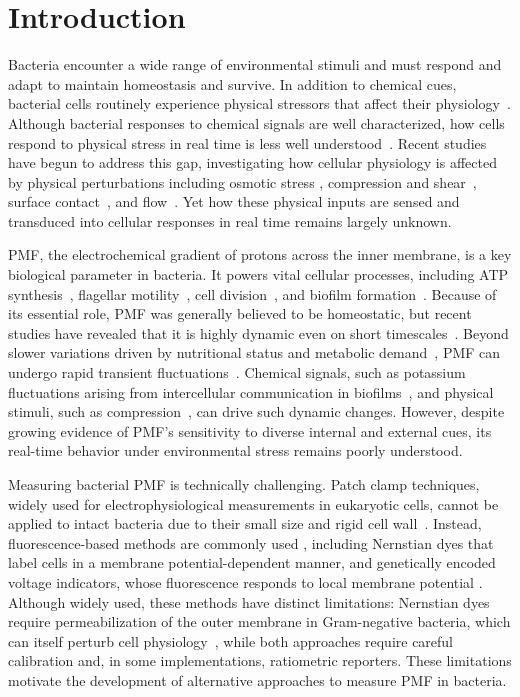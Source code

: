 \documentclass[twocolumn]{biophys-new}%
\begin{document}
\section*{Introduction}
Bacteria encounter a wide range of environmental stimuli and must respond and adapt to maintain homeostasis and survive. In addition to chemical cues, bacterial cells routinely experience physical stressors that affect their physiology~\cite{BELAS2014biofilms,PERSAT2017bacterial}. Although bacterial responses to chemical signals are well characterized, how cells respond to physical stress in real time is less well understood~\cite{gordon2019}. Recent studies have begun to address this gap, investigating how cellular physiology is affected by physical perturbations including osmotic stress \cite{bialecka2015,buda2016,sun2021,al2022}, compression and shear~\cite{bruni2017,kaya2012,mathijssen2019,figueroa2020}, surface contact~\cite{vrabioiu2022}, and flow~\cite{palalay2023,simsek2023}. Yet how these physical inputs are sensed and transduced into cellular responses in real time remains largely unknown.

PMF, the electrochemical gradient of protons across the inner membrane, is a key biological parameter in bacteria. It powers vital cellular processes, including ATP synthesis~\cite{Mitchell1961,Maloney1974}, flagellar motility~\cite{manson1977l,wadhwa2022bacterial}, cell division~\cite{Strahl2010}, and biofilm formation~\cite{prindle2015}. Because of its essential role, PMF was generally believed to be homeostatic, but recent studies have revealed that it is highly dynamic even on short timescales~\cite{ BENARROCH2020304l, biquet2021dynamicl}. Beyond slower variations driven by nutritional status and metabolic demand~\cite{kashket1981proton}, PMF can undergo rapid transient fluctuations~\cite{Kralj2011}. Chemical signals, such as potassium fluctuations arising from intercellular communication in biofilms~\cite{prindle2015,akabuogu2025emergence}, and physical stimuli, such as compression~\cite{bruni2017}, can drive such dynamic changes. However, despite growing evidence of PMF's sensitivity to diverse internal and external cues, its real-time behavior under environmental stress remains poorly understood.

Measuring bacterial PMF is technically challenging. Patch clamp techniques, widely used for electrophysiological measurements in eukaryotic cells, cannot be applied to intact bacteria due to their small size and rigid cell wall~\cite{BENARROCH2020304l,Martinac2013}. Instead, fluorescence-based methods are commonly used \cite{KRASNOPEEVA2019l,MANCINI20204l}, including Nernstian dyes that label cells in a membrane potential-dependent manner, and genetically encoded voltage indicators, whose fluorescence responds to local membrane potential \cite{LO2007etl,jinetal2023l}. Although widely used, these methods have distinct limitations: Nernstian dyes require permeabilization of the outer membrane in Gram-negative bacteria, which can itself perturb cell physiology~\cite{KRASNOPEEVA2019l,buttress2022}, while both approaches require careful calibration and, in some implementations, ratiometric reporters. These limitations motivate the development of alternative approaches to measure PMF in bacteria.
\end{document}
